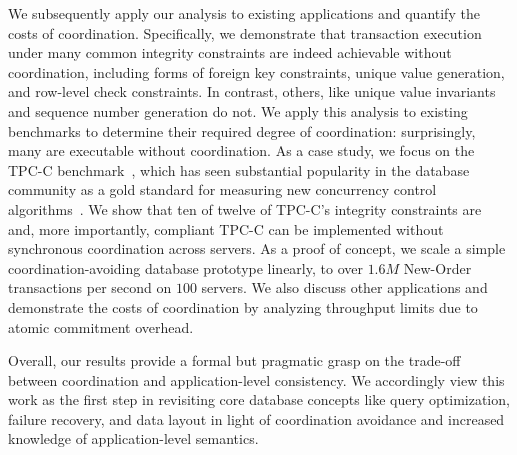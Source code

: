 
We subsequently apply our \iconfluence analysis to existing
applications and quantify the costs of coordination. Specifically, we
demonstrate that transaction execution under many common integrity
constraints are indeed achievable without coordination, including
forms of foreign key constraints, unique value generation, and
row-level check constraints. In contrast, others, like unique value
invariants and sequence number generation do not. We apply this
analysis to existing benchmarks to determine their required degree of
coordination: surprisingly, many are executable without
coordination. As a case study, we focus on the TPC-C
benchmark~\cite{tpcc}, which has seen substantial popularity in the
database community as a gold standard for measuring new concurrency
control
algorithms~\cite{abadi-vll,jones-dtxn,schism,calvin,hstore,oltpbench}. We
show that ten of twelve of TPC-C's integrity constraints are
\iconfluent and, more importantly, compliant TPC-C can be implemented
without synchronous coordination across servers. As a proof of
concept, we scale a simple coordination-avoiding database prototype
linearly, to over $1.6M$ New-Order transactions per second on $100$
servers. We also discuss other applications and demonstrate the costs
of coordination by analyzing throughput limits due to atomic
commitment overhead.

Overall, our results provide a formal but pragmatic grasp on the
trade-off between coordination and application-level consistency. We
accordingly view this work as the first step in revisiting core
database concepts like query optimization, failure recovery, and data
layout in light of coordination avoidance and increased knowledge of
application-level semantics.


